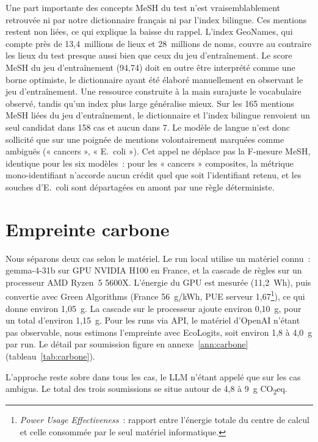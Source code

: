 \documentclass[10pt,twoside]{article}
\begin{document}
Une part importante des concepts MeSH du test n'est vraisemblablement retrouvée ni par notre
dictionnaire français ni par l'index bilingue. Ces mentions restent non liées, ce qui explique
la baisse du rappel. L'index GeoNames, qui compte près de 13,4~millions de lieux et 28~millions de
noms, couvre au contraire les lieux du test presque aussi bien que ceux du jeu d'entraînement. Le score MeSH du
jeu d'entraînement (94,74) doit en outre être interprété comme une borne optimiste, le dictionnaire ayant été
élaboré manuellement en observant le jeu d'entraînement. Une ressource construite à la main surajuste le
vocabulaire observé, tandis qu'un index plus large généralise mieux. Sur les 165 mentions MeSH liées du
jeu d'entraînement, le dictionnaire et l'index bilingue renvoient un seul candidat dans 158 cas et aucun dans 7. 
Le modèle de langue n'est donc sollicité que sur une poignée de mentions volontairement marquées
comme ambiguës (« cancers », « E.~coli »). Cet appel ne déplace pas la F-mesure MeSH, identique
pour les six modèles~: pour les « cancers » composites, la métrique mono-identifiant n'accorde aucun
crédit quel que soit l'identifiant retenu, et les souches d'E.~coli sont départagées en amont par
une règle déterministe.

\section{Empreinte carbone}
\label{sec:carbone}

Nous séparons deux cas selon le matériel. Le run local utilise un matériel connu~: gemma-4-31b sur
GPU NVIDIA H100 en France, et la cascade de règles sur un processeur AMD Ryzen~5 5600X. L'énergie du
GPU est mesurée (11,2~Wh), puis convertie avec Green Algorithms (France 56~g/kWh, PUE serveur
1,67\footnote{\emph{Power Usage Effectiveness}~: rapport entre l'énergie totale du centre de calcul
et celle consommée par le seul matériel informatique.}), ce qui donne environ 1,05~g. La cascade
sur le processeur ajoute environ 0,10~g, pour un total d'environ 1,15~g. Pour les runs via API, le matériel
d'OpenAI n'étant pas observable, nous estimons l'empreinte avec EcoLogits, soit environ 1,8 à
4,0~g par run. Le détail par soumission figure en annexe~\ref{ann:carbone}
(tableau~\ref{tab:carbone}).

L'approche reste sobre dans tous les cas, le LLM n'étant appelé que sur les cas ambigus. Le total des trois soumissions
se situe autour de 4,8 à 9~g CO\textsubscript{2}eq.
\end{document}
